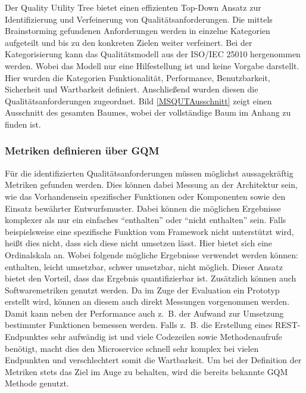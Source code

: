 
Der Quality Utility Tree bietet einen effizienten Top-Down Ansatz zur Identifizierung und Verfeinerung von Qualitätsanforderungen. Die mittels Brainstorming gefundenen Anforderungen werden in einzelne Kategorien aufgeteilt und bis zu den konkreten Zielen weiter verfeinert. Bei der Kategorisierung kann das Qualitätsmodell aus der ISO/IEC 25010 hergenommen werden. Wobei das Modell nur eine Hilfestellung ist und keine Vorgabe darstellt. Hier wurden die Kategorien Funktionalität, Performance, Benutzbarkeit, Sicherheit und Wartbarkeit definiert. Anschließend wurden diesen die Qualitätsanforderungen zugeordnet. Bild \ref{MSQUTAusschnitt} zeigt einen Ausschnitt des gesamten Baumes, wobei der vollständige Baum im Anhang zu finden ist. 


\subsubsection{Metriken definieren über \ac{GQM}}

Für die identifizierten Qualitätsanforderungen müssen möglichst aussagekräftig Metriken gefunden werden. Dies können dabei Messung an der Architektur sein, wie das Vorhandensein spezifischer Funktionen oder Komponenten sowie den Einsatz bewährter Entwurfsmuster. Dabei können die möglichen Ergebnisse komplexer als nur ein einfaches \enquote{enthalten} oder \enquote{nicht enthalten} sein. Falls beispielsweise eine spezifische Funktion vom Framework nicht unterstützt wird, heißt dies nicht, dass sich diese nicht umsetzen lässt. Hier bietet sich eine Ordinalskala an. Wobei folgende mögliche Ergebnisse verwendet werden können: enthalten, leicht umsetzbar, schwer umsetzbar, nicht möglich. Dieser Ansatz bietet den Vorteil, dass das Ergebnis quantifizierbar ist.
Zusätzlich können auch Softwaremetriken genutzt werden. Da im Zuge der Evaluation ein Prototyp erstellt wird, können an diesem auch direkt Messungen vorgenommen werden. Damit kann neben der Performance auch z.~B. der Aufwand zur Umsetzung bestimmter Funktionen bemessen werden. Falls z.~B. die Erstellung eines \ac{REST}-Endpunktes sehr aufwändig ist und viele Codezeilen sowie Methodenaufrufe benötigt, macht dies den Microservice schnell sehr komplex bei vielen Endpunkten und verschlechtert somit die Wartbarkeit.
Um bei der Definition der Metriken stets das Ziel im Auge zu behalten, wird die bereits bekannte \ac{GQM} Methode genutzt. 

